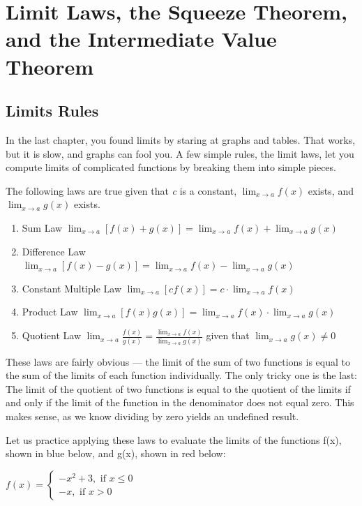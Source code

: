 \chapter{Limit Laws, the Squeeze Theorem, and the Intermediate Value Theorem}

\section{Limits Rules}
In the last chapter, you found limits by staring at graphs and tables.
That works, but it is slow, and graphs can fool you. A few simple rules,
the limit laws, let you compute limits of complicated functions by breaking
them into simple pieces.

The following laws are true given that \textit{c} is a constant, $\lim_{x\to a} 
f(x) $ exists, and $\lim_{x\to a} g(x) $ exists.

\begin{enumerate}
    \item Sum Law $\lim_{x\to a} \left[f(x) + g(x) \right] = \lim_{x\to a} f(x) 
    + \lim_{x\to a} g(x)$
    \item Difference Law $\lim_{x\to a} \left[f(x) - g(x) \right] = 
    \lim_{x\to a} f(x) - \lim_{x\to a} g(x)$
    \item Constant Multiple Law $\lim_{x\to a} \left[\textit{c}f(x) \right] = 
    \textit{c} \cdot \lim_{x\to a} f(x) $
    \item Product Law $\lim_{x\to a} \left[f(x)g(x) \right] = \lim_{x\to a}f(x) 
    \cdot \lim_{x\to a} g(x)$
    \item Quotient Law $\lim_{x\to a} \frac{f(x)}{g(x)} = \frac{\lim_{x\to a} 
    f(x)}{\lim_{x\to a} g(x)}$ given that $\lim_{x\to a} g(x) \neq 0$
\end{enumerate}
These laws are fairly obvious --- the limit of the sum of two functions is equal to 
the sum of the limits of each function individually. The only tricky one is the 
last: The limit of the quotient of two functions is equal to the quotient of the 
limits if and only if the limit of the function in the denominator does not equal 
zero. This makes sense, as we know dividing by zero yields an undefined result. 

Let us practice applying these laws to evaluate the limits of the functions f(x), 
shown in blue below, and g(x), shown in red below:

$f(x) = \begin{cases}
    -x^2+3, \text{ if } x \leq 0\\
    -x, \text{ if } x > 0
\end{cases}$

